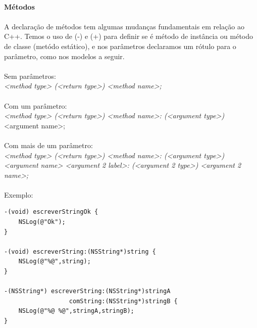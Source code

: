 \documentclass[a4paper,12pt,brazil,doubleside]{book}
\begin{document}
\paragraph{}\textbf{Métodos}

\paragraph{}A declaração de métodos tem algumas mudanças fundamentais em relação ao C++. Temos o uso de (-) e (+) para definir se é método de instância ou método de classe (metódo estático), e nos parâmetros declaramos um rótulo para o parâmetro, como nos modelos a seguir.

\paragraph{}Sem parâmetros:\\
\emph{<method type> (<return type>) <method name>;}

\paragraph{}Com um parâmetro:\\
\emph{<method type> (<return type>) <method name>: (<argument type>)} <argument name>;

\paragraph{}Com mais de um parâmetro:\\
\emph{<method type> (<return type>) <method name>: (<argument type>) <argument name> <argument 2 label>: (<argument 2 type>) <argument 2 name>;}

\paragraph{}Exemplo:

\begin{listing}
\begin{verbatim}
-(void) escreverStringOk {
	NSLog(@"Ok");
}

-(void) escreverString:(NSString*)string {
	NSLog(@"%@",string);
}

-(NSString*) escreverString:(NSString*)stringA
                  comString:(NSString*)stringB {
	NSLog(@"%@ %@",stringA,stringB);
}
\end{verbatim}
\end{listing}
\end{document}
